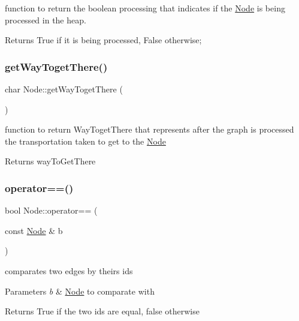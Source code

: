 function to return the boolean processing that indicates if the \hyperlink{class_node}{Node} is being processed in the heap. 

\begin{DoxyReturn}{Returns}
True if it is being processed, False otherwise; 
\end{DoxyReturn}
\mbox{\label{class_node_ac230b85aee55e214e3c255a044bb3118}} 
\subsubsection{\texorpdfstring{get\+Way\+Toget\+There()}{getWayTogetThere()}}
{\footnotesize\ttfamily char Node\+::get\+Way\+Toget\+There (\begin{DoxyParamCaption}{ }\end{DoxyParamCaption})\hspace{0.3cm}{\ttfamily [inline]}}



function to return Way\+Toget\+There that represents after the graph is processed the transportation taken to get to the \hyperlink{class_node}{Node} 

\begin{DoxyReturn}{Returns}
way\+To\+Get\+There 
\end{DoxyReturn}
\mbox{\label{class_node_a4633c1db13c9623cea114fe1851ae290}} 
\subsubsection{\texorpdfstring{operator==()}{operator==()}}
{\footnotesize\ttfamily bool Node\+::operator== (\begin{DoxyParamCaption}\item[{const \hyperlink{class_node}{Node} \&}]{b }\end{DoxyParamCaption})}



comparates two edges by theirs ids 


\begin{DoxyParams}{Parameters}
{\em b} & \hyperlink{class_node}{Node} to comparate with \\
\hline
\end{DoxyParams}
\begin{DoxyReturn}{Returns}
True if the two id\textquotesingle{}s are equal, false otherwise 
\end{DoxyReturn}
\mbox{\label{class_node_a9ff3a1149a7e9c427fdba4068c11a42b}} 
